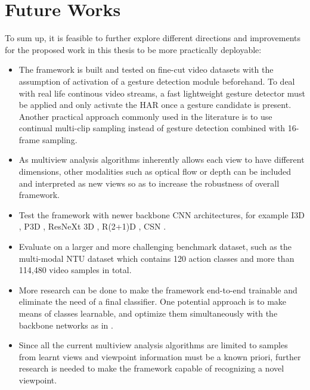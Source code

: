 
\section{Future Works} \label{sec:future_works}


    To sum up, it is feasible to further explore different directions and improvements for the proposed work in this thesis to be more practically deployable:
    \begin{itemize}
        \item The framework is built and tested on fine-cut video datasets with the assumption of activation of a gesture detection module beforehand. To deal with real life continous video streams, a fast lightweight gesture detector must be applied and only activate the HAR once a gesture candidate is present. Another practical approach commonly used in the literature is to use continual multi-clip sampling instead of gesture detection combined with 16-frame sampling.
        \item As multiview analysis algorithms inherently allows each view to have different dimensions, other modalities such as optical flow or depth can be included and interpreted as new views so as to increase the robustness of overall framework.
        \item Test the framework with newer backbone CNN architectures, for example I3D \cite{joao2017quo}, P3D \cite{qiu2017learning}, ResNeXt 3D \cite{hara2018can}, R(2+1)D \cite{du2018a}, CSN \cite{du2019video}.
        \item Evaluate on a larger and more challenging benchmark dataset, such as the multi-modal NTU dataset \cite{shahroudy2016ntu} which contains 120 action classes and more than 114,480 video samples in total.
        \item More research can be done to make the framework end-to-end trainable and eliminate the need of a final classifier. One potential approach is to make means of classes learnable, and optimize them simultaneously with the backbone networks as in \cite{wen2016a}.
        \item Since all the current multiview analysis algorithms are limited to samples from learnt views and viewpoint information must be a known priori, further research is needed to make the framework capable of recognizing a novel viewpoint.
    \end{itemize}
